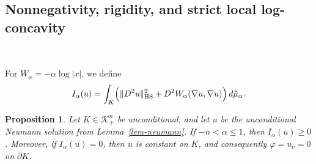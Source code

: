\documentclass[12pt,leqno]{amsart}
\theoremstyle{plain} \newtheorem{thm}{Theorem}[section]
\theoremstyle{plain} \newtheorem{prop}[thm]{Proposition}
\theoremstyle{plain} \newtheorem{prob}[thm]{Problem}
\theoremstyle{definition} \newtheorem{defi}[thm]{Definition}
\theoremstyle{plain} \newtheorem{cor}[thm]{Corollary}
\theoremstyle{plain} \newtheorem{lem}[thm]{Lemma}
\theoremstyle{plain} \newtheorem{eg}{Example}[section]
\theoremstyle{remark} \newtheorem{rmk}[thm]{Remark}
\theoremstyle{plain} \newtheorem{conj}{Conjecture}
\numberwithin{equation}{section}
\newcommand{\dd}{\,d}
\newcommand{\HS}{\mathrm{HS}}
\begin{document}
\subsection{Nonnegativity, rigidity, and strict local log-concavity}\
\label{sec-nonnegative-logconcavity}

For $W_{\alpha}=-\alpha\log|x|$, we define
\begin{equation}\label{eq-I-alpha}
  I_\alpha(u)
  =\int_K\Bigl(
    \|D^2u\|_{\HS}^2
    +D^2 W_{\alpha}(\nabla u,\nabla u)
  \Bigr)\dd\tilde{\mu}_\alpha . 
\end{equation}

\begin{prop}\label{prop-energy}
  Let $K\in\mathcal{K}_{+}^n$ be unconditional, and let $u$ be
  the unconditional Neumann solution from Lemma~\ref{lem-neumann}. If
  $-n<\alpha\le1$, then $I_\alpha(u)\ge0$.
  Moreover, if $I_\alpha(u)=0$, then $u$ is constant on $K$, and
  consequently $\varphi = u_\nu = 0$ on $\partial K$.
\end{prop}
\end{document}
